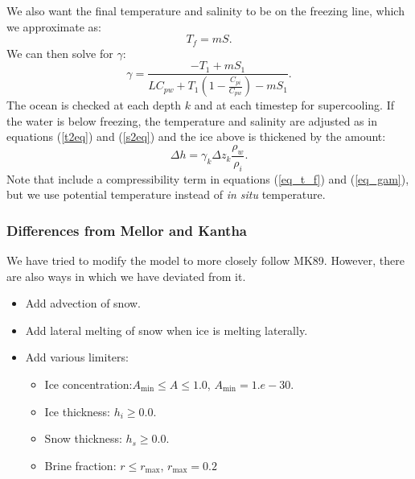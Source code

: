 We also want the final temperature and salinity to be on the freezing
line, which we approximate as:
\begin{equation}
   T_f = m S .
  \label{eq_t_f}
\end{equation}
We can then solve for $\gamma$:
\begin{equation}
   \gamma = \frac{-T_1 + mS_1 }{ {L }{ C_{pw}}+ T_1 \left( 1
   - \frac{C_{pi} }{ C_{pw}} \right) - mS_1} .
  \label{eq_gam}
\end{equation}
The ocean is checked at each depth $k$ and at each timestep for
supercooling.  If the water is below freezing, the temperature and
salinity are adjusted as in equations (\ref{t2eq}) and (\ref{s2eq})
and the ice above is thickened by the amount:
\begin{equation}
   \Delta h = \gamma_k \Delta z_k \frac{\rho_w}{\rho_i} .
\end{equation}
Note that \citet{Steele89} include a compressibility term in equations
(\ref{eq_t_f}) and (\ref{eq_gam}), but we use potential temperature
instead of {\em in situ} temperature.

\subsubsection{Differences from Mellor and Kantha}
We have tried to modify the  model to more closely follow
MK89. However, there are also ways in which we have deviated from it.
\begin{itemize}
  \item Add advection of snow.
  \item Add lateral melting of snow when ice is melting laterally.
  \item Add various limiters:
    \begin{itemize}
      \item Ice concentration:$A_{\min} \leq A \leq 1.0$, $A_{\min} =
      1.e-30$.
      \item Ice thickness: $h_i \geq 0.0$.
      \item Snow thickness: $h_s \geq 0.0$.
      \item Brine fraction: $r \leq r_{\max}$, $r_{\max} = 0.2$
    \end{itemize}
\end{itemize}
